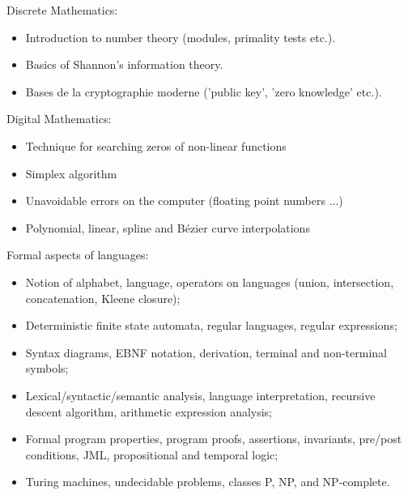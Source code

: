 Discrete Mathematics:
\begin{itemize}
    \item Introduction to number theory (modules, primality tests etc.).
    \item Basics of Shannon's information theory.
    \item Bases de la cryptographie moderne ('public key', 'zero knowledge' etc.).
\end{itemize}
Digital Mathematics:
\begin{itemize}
    \item Technique for searching zeros of non-linear functions
    \item Simplex algorithm
    \item Unavoidable errors on the computer (floating point numbers ...)
    \item Polynomial, linear, spline and Bézier curve interpolations
\end{itemize}
Formal aspects of languages:
\begin{itemize}
    \item Notion of alphabet, language, operators on languages (union, intersection, concatenation, Kleene closure);
    \item Deterministic finite state automata, regular languages, regular expressions;
    \item Syntax diagrams, EBNF notation, derivation, terminal and non-terminal symbols;
    \item Lexical/syntactic/semantic analysis, language interpretation, recursive descent algorithm, arithmetic expression analysis;
    \item Formal program properties, program proofs, assertions, invariants, pre/post conditions, JML, propositional and temporal logic;
    \item Turing machines, undecidable problems, classes P, NP, and NP-complete.
\end{itemize}